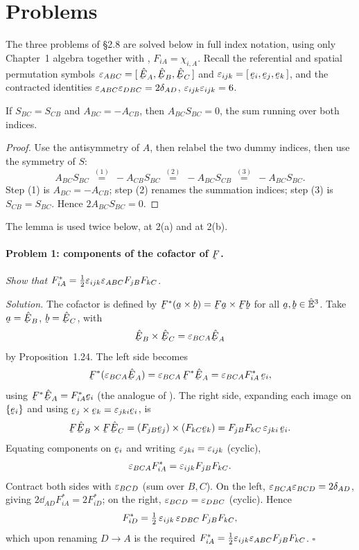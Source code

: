 \setcounter{problemenv}{0}
\section{Problems}\label{sec:problems:c2}

The three problems of \S2.8 are solved below in full index notation, using
only Chapter~1 algebra together with , $F_{iA}=\chi_{i,A}$. Recall
the referential and spatial permutation symbols
$\eps_{ABC}=\tbox{\hbE_A}{\hbE_B}{\hbE_C}$ and
$\eps_{ijk}=\tbox{\be_i}{\be_j}{\be_k}$, and the contracted identities
$\varepsilon_{ABC}\varepsilon_{DBC}=2\delta_{AD}$, $\varepsilon_{ijk}\varepsilon_{ijk}=6$.

\begin{lemma}
\label{lem:symskw}
If $S_{BC}=S_{CB}$ and $A_{BC}=-A_{CB}$, then $A_{BC}S_{BC}=0$, the sum
running over both indices.
\end{lemma}

\begin{proof}
Use the antisymmetry of $A$, then relabel the two dummy indices, then use
the symmetry of $S$:
\[
   A_{BC}S_{BC}\ \overset{(1)}{=}\ -A_{CB}S_{BC}
   \ \overset{(2)}{=}\ -A_{BC}S_{CB}
   \ \overset{(3)}{=}\ -A_{BC}S_{BC}.
\]
Step (1) is $A_{BC}=-A_{CB}$; step (2) renames the summation indices; step
(3) is $S_{CB}=S_{BC}$. Hence $2A_{BC}S_{BC}=0$.
\end{proof}

The lemma is used twice below, at 2(a) and at 2(b).

%
\paragraph*{Problem 1: components of the cofactor of $\bF$.}
\emph{Show that} $F^{*}_{iA}=\tfrac12\varepsilon_{ijk}\varepsilon_{ABC}F_{jB}F_{kC}$.

\emph{Solution.} The cofactor is defined by $\bF^{*}(\ba\times\bb)
=\bF\ba\times\bF\bb$ for all $\ba,\bb\in\hVt$. Take $\ba=\hbE_B$,
$\bb=\hbE_C$, with
\[
   \hbE_B\times\hbE_C=\eps_{BCA}\hbE_A
\]
by Proposition~1.24. The left side becomes
\[
   \bF^{*}(\eps_{BCA}\hbE_A)=\eps_{BCA}\,\bF^{*}\hbE_A
   =\eps_{BCA}F^{*}_{iA}\,\be_i ,
\]
using $\bF^{*}\hbE_A=F^{*}_{iA}\be_i$ (the analogue of ). The right
side, expanding each image on $\{\be_i\}$ and using
$\be_j\times\be_k=\eps_{jki}\be_i$, is
\[
   \bF\hbE_B\times\bF\hbE_C=(F_{jB}\be_j)\times(F_{kC}\be_k)
   =F_{jB}F_{kC}\,\eps_{jki}\,\be_i .
\]
Equating components on $\be_i$ and writing $\varepsilon_{jki}=\varepsilon_{ijk}$ (cyclic),
\[
   \varepsilon_{BCA}F^{*}_{iA}=\varepsilon_{ijk}F_{jB}F_{kC}.
\]
Contract both sides with $\varepsilon_{BCD}$ (sum over $B,C$). On the left,
$\varepsilon_{BCA}\varepsilon_{BCD}=2\delta_{AD}$, giving $2\dd_{AD}F^{*}_{iA}=2F^{*}_{iD}$;
on the right, $\varepsilon_{BCD}=\varepsilon_{DBC}$ (cyclic). Hence
\[
   F^{*}_{iD}=\tfrac12\,\varepsilon_{ijk}\,\varepsilon_{DBC}\,F_{jB}F_{kC},
\]
which upon renaming $D\to A$ is the required
$F^{*}_{iA}=\tfrac12\varepsilon_{ijk}\varepsilon_{ABC}F_{jB}F_{kC}$. \hfill$\square$

